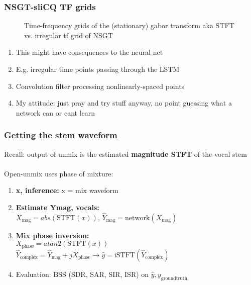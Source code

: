 \documentclass[usenames,dvipsnames]{beamer}
\begin{document}
\begin{frame}
	\frametitle{NSGT-sliCQ TF grids}
	\begin{figure}[ht]
		\hspace{0.5em}
		\caption{Time-frequency grids of the (stationary) gabor transform aka STFT vs. irregular tf grid of NSGT}
	\end{figure}
	\begin{enumerate}
		\item
			This might have consequences to the neural net
		\item
			E.g. irregular time points passing through the LSTM
		\item
			Convolution filter processing nonlinearly-spaced points
		\item
			My attitude: just pray and try stuff anyway, no point guessing what a network can or cant learn
	\end{enumerate}
\end{frame}

\begin{frame}
	\frametitle{Getting the stem waveform}
	Recall: output of unmix is the estimated \textbf{magnitude STFT} of the vocal stem\\\ \\

	Open-unmix uses phase of mixture:
	\begin{enumerate}
		\item
			\textbf{x, inference:} x = mix waveform
		\item
			\textbf{Estimate Ymag, vocals:}\\
			\qquad $X_{\text{mag}} = abs(\text{STFT}(x))$, $\hat{Y}_{\text{mag}} = \text{network}(X_{\text{mag}})$
		\item
			\textbf{Mix phase inversion:}\\
			\qquad $X_{\text{phase}} = atan2(\text{STFT}(x))$\\
			\qquad $\hat{Y}_{\text{complex}} = \hat{Y}_{\text{mag}} + j X_{\text{phase}} \rightarrow \hat{y} = \text{iSTFT}(\hat{Y}_{\text{complex}})$
		\item
			Evaluation: BSS (SDR, SAR, SIR, ISR) on $\hat{y}, y_{\text{groundtruth}}$
	\end{enumerate}
\end{frame}
\end{document}
